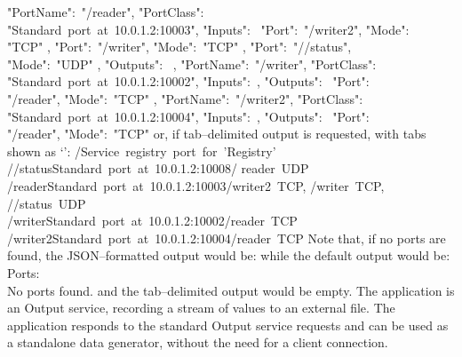 \textbraceleft{} "PortName":\ "/reader", "PortClass":\ \\
"Standard~port~at~10.0.1.2:10003", "Inputs":\ \openSq{} \textbraceleft{} "Port":\
"/writer2", "Mode":\ \\
"TCP" \textbraceright{}, \textbraceleft{} "Port":\ "/writer", "Mode":\ "TCP"
\textbraceright, \textbraceleft{} "Port":\ "/\dollarService/status",\\
"Mode":\ "UDP" \textbraceright{} \closeSq, "Outputs":\ \sqPair{} \textbraceright,
\textbraceleft{} "PortName":\ "/writer", "PortClass":\ \\
"Standard~port~at~10.0.1.2:10002", "Inputs":\ \sqPair, "Outputs":\ \openSq{}
\textbraceleft{} "Port":\ \\
"/reader", "Mode":\ "TCP" \textbraceright{} \closeSq{} \textbraceright{},
\textbraceleft{} "PortName":\ "/writer2", "PortClass":\ \\
"Standard~port~at~10.0.1.2:10004", "Inputs":\ \sqPair, "Outputs":\ \openSq{}
\textbraceleft{} "Port":\ \\
"/reader", "Mode":\ "TCP" \textbraceright{} \closeSq{} \textbraceright{} \closeSq
\outputEnd{}
or, if tab--delimited output is requested, with tabs shown as
`\texttt{\boldmath{$\vdash$}}':
\outputBegin{}
/\dollarService\pseudotab{}Service~registry~port~for~'Registry'\\		
/\dollarService/status\pseudotab{}Standard~port~at~10.0.1.2:10008\pseudotab/%
reader~UDP\\
/reader\pseudotab{}Standard~port~at~10.0.1.2:10003\pseudotab/writer2~TCP,
/writer~TCP,\\
\hspace*{2em}/\dollarService/status~UDP\\
/writer\pseudotab{}Standard~port~at~10.0.1.2:10002\pseudotab/reader~TCP\\
/writer2\pseudotab{}Standard~port~at~10.0.1.2:10004\pseudotab/reader~TCP
\outputEnd{}
Note that, if no ports are found, the JSON--formatted output would be:
\outputBegin{}
\sqPair
\outputEnd{}
while the default output would be:
\outputBegin{}
Ports:\\
\settowidth{\utilLen}{Por}%
\hspace*{\utilLen}No ports found.
\outputEnd{}
and the tab--delimited output would be empty.
The  application is an Output
service, recording a stream of \yarp{} values to an external file.
The application responds to the standard Output service requests and can be used as a
standalone data generator, without the need for a client connection.\\

